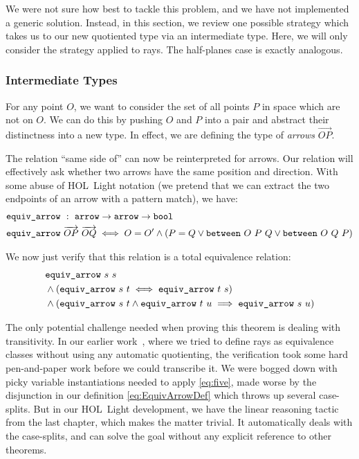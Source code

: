 We were not sure how best to tackle this problem, and we have not implemented a generic solution. Instead, in this section, we review one possible strategy which takes us to our new quotiented type via an intermediate type. Here, we will only consider the strategy applied to rays. The half-planes case is exactly analogous.

\subsubsection{Intermediate Types}
For any point $O$, we want to consider the set of all points $P$ in space which are not on $O$. We can do this by pushing $O$ and $P$ into a pair and abstract their distinctness into a new type. In effect, we are defining the type of \emph{arrows} $\overrightarrow{OP}$. 

The relation ``same side of'' can now be reinterpreted for arrows. Our relation will effectively ask whether two arrows have the same position and direction. With some abuse of HOL~Light notation (we pretend that we can extract the two endpoints of an arrow with a pattern match), we have:
\begin{equation}\label{eq:EquivArrowDef}
  \begin{split}
    &\code{equiv\_arrow}\ :\ \code{arrow} \rightarrow \code{arrow}\rightarrow \code{bool}\\
    &\code{equiv\_arrow}\ \overrightarrow{OP}\ \overrightarrow{OQ}\iff O = O' \wedge (P = Q \vee \between{O}{P}{Q} \vee \between{O}{Q}{P})
  \end{split}
\end{equation}

We now just verify that this relation is a total equivalence relation:
\begin{equation}
  \begin{split}
    &\code{equiv\_arrow}\ s\ s\\
    &\wedge (\code{equiv\_arrow}\ s\ t \iff \code{equiv\_arrow}\ t\ s)\\
    &\wedge (\code{equiv\_arrow}\ s\ t \wedge \code{equiv\_arrow}\ t\ u \implies\code{equiv\_arrow}\ s\ u)
  \end{split}
\end{equation}

\label{sec:RayTransitivity}The only potential challenge needed when proving this theorem is dealing with transitivity. In our earlier work~\cite{ScottMScThesis}, where we tried to define rays as equivalence classes without using any automatic quotienting, the verification took some hard pen-and-paper work before we could transcribe it. We were bogged down with picky variable instantiations needed to apply \ref{eq:five}, made worse by the disjunction in our definition \eqref{eq:EquivArrowDef} which throws up several case-splits. But in our HOL~Light development, we have the linear reasoning tactic from the last chapter, which makes the matter trivial. It automatically deals with the case-splits, and can solve the goal without any explicit reference to other theorems.

